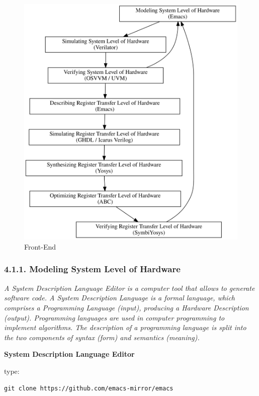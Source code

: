 \documentclass[
]{article}
\begin{document}
\begin{figure}
\centering
\includegraphics{../doc/front-end.svg}
\caption{Front-End}
\end{figure}

\hypertarget{modeling-system-level-of-hardware-1}{%
\subsubsection{4.1.1. Modeling System Level of
Hardware}\label{modeling-system-level-of-hardware-1}}

\emph{A System Description Language Editor is a computer tool that
allows to generate software code. A System Description Language is a
formal language, which comprises a Programming Language (input),
producing a Hardware Description (output). Programming languages are
used in computer programming to implement algorithms. The description of
a programming language is split into the two components of syntax (form)
and semantics (meaning).}

\textbf{System Description Language Editor}

type:

\begin{verbatim}
git clone https://github.com/emacs-mirror/emacs
\end{verbatim}
\end{document}
